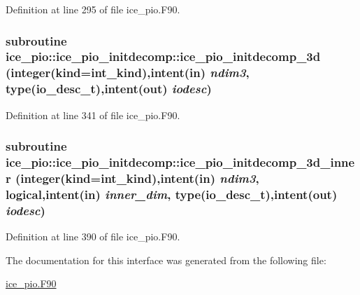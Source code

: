 Definition at line 295 of file ice\_\-pio.F90.\hypertarget{interfaceice__pio_1_1ice__pio__initdecomp_ab55d8fe89230d56d405d243986283c3e}{
\subsubsection[{ice\_\-pio\_\-initdecomp\_\-3d}]{\setlength{\rightskip}{0pt plus 5cm}subroutine ice\_\-pio::ice\_\-pio\_\-initdecomp::ice\_\-pio\_\-initdecomp\_\-3d (integer(kind=int\_\-kind),intent(in) {\em ndim3}, \/  type(io\_\-desc\_\-t),intent(out) {\em iodesc})}}
\label{interfaceice__pio_1_1ice__pio__initdecomp_ab55d8fe89230d56d405d243986283c3e}


Definition at line 341 of file ice\_\-pio.F90.\hypertarget{interfaceice__pio_1_1ice__pio__initdecomp_a2041a5782b522f05deebacd7ae7a47b8}{
\subsubsection[{ice\_\-pio\_\-initdecomp\_\-3d\_\-inner}]{\setlength{\rightskip}{0pt plus 5cm}subroutine ice\_\-pio::ice\_\-pio\_\-initdecomp::ice\_\-pio\_\-initdecomp\_\-3d\_\-inner (integer(kind=int\_\-kind),intent(in) {\em ndim3}, \/  logical,intent(in) {\em inner\_\-dim}, \/  type(io\_\-desc\_\-t),intent(out) {\em iodesc})}}
\label{interfaceice__pio_1_1ice__pio__initdecomp_a2041a5782b522f05deebacd7ae7a47b8}


Definition at line 390 of file ice\_\-pio.F90.

The documentation for this interface was generated from the following file:\begin{DoxyCompactItemize}
\item 
\hyperlink{ice__pio_8F90}{ice\_\-pio.F90}\end{DoxyCompactItemize}
